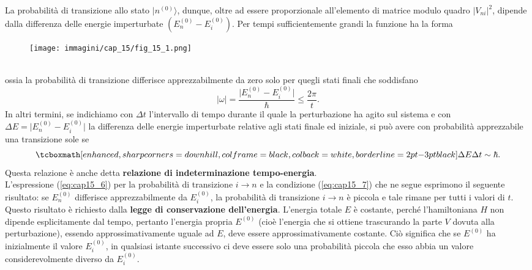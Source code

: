 \documentclass[a4paper,12pt,oneside]{book}
\begin{document}
La probabilità di transizione allo stato $\vert n ^{(0)} \rangle$, dunque, oltre ad essere proporzionale all'elemento di matrice modulo quadro $\vert V_{ni}\vert ^2$, dipende dalla differenza delle energie imperturbate $(E_n ^{(0)} - E_i ^{(0)}) $. Per tempi sufficientemente grandi la funzione ha la forma
\begin{figure}[!htbp]
\begin{center}
\texttt{[image: immagini/cap\_15/fig\_15\_1.png]}
\end{center}
\end{figure}\\
ossia la probabilità di transizione differisce apprezzabilmente da zero solo per quegli stati finali che soddisfano
\begin{equation}
\vert \omega \vert = \frac{\vert E_n ^{(0)} - E_i ^{(0)}\vert}{\hbar} \leq \frac{2\pi}{t}.
\end{equation}
In altri termini, se indichiamo con $\Delta t$ l'intervallo di tempo durante il quale la perturbazione ha agito sul sistema e con $\Delta E = \vert E_n ^{(0)} - E_i ^{(0)}\vert$ la differenza delle energie imperturbate relative agli stati finale ed iniziale, si può avere con probabilità apprezzabile una transizione sole se
	\begin{equation}
		\tcboxmath[enhanced, sharp corners=downhill, colframe=black, colback=white, borderline={2pt}{-3pt}{black}]{
			\Delta E \Delta t \sim \hbar .
			}
	\label{eq:cap15_7}
	\end{equation}
Questa relazione è anche detta \textbf{relazione di indeterminazione tempo-energia}.\\

L'espressione (\ref{eq:cap15_6}) per la probabilità di transizione $i\rightarrow n$ e la condizione (\ref{eq:cap15_7}) che ne segue esprimono il seguente risultato: se $E_n ^{(0)}$ differisce apprezzabilmente da   $E_i ^{(0)}$, la probabilità di transizione $i \rightarrow n$ è piccola e tale rimane per tutti i valori di $t$. Questo risultato è richiesto dalla  \textbf{legge di conservazione dell'energia}. L'energia totale $E$ è costante, perché l'hamiltoniana $H$ non dipende esplicitamente dal tempo, pertanto l'energia propria $E^{(0)}$ (cioè l'energia che si ottiene trascurando la parte $V$ dovuta alla perturbazione), essendo approssimativamente uguale ad $E$, deve essere approssimativamente costante. Ciò significa che se $E^{(0)}$ ha inizialmente il valore $E _i ^{(0)}$, in qualsiasi istante successivo ci deve essere solo una probabilità piccola che esso abbia un valore considerevolmente diverso da $E _i ^{(0)}$.\\
\end{document}
